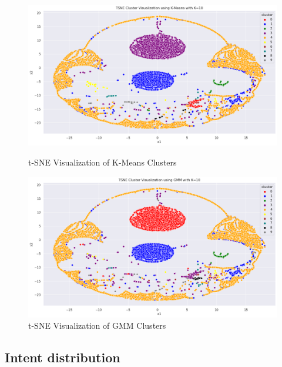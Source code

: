         \begin{figure}[h]
            \centering
            \begin{minipage}[c]{0.47\textwidth}
                \centering
                \includegraphics[width=\textwidth]{../figures/plots/section3/tsne_kmeans_clusters_1.png}
                \caption{t-SNE Visualization of K-Means Clusters}
                \label{fig:tsne_kmeans}
            \end{minipage}
            \hfill
            \begin{minipage}[c]{0.47\textwidth}
                \centering
                \includegraphics[width=\textwidth]{../figures/plots/section3/tsne_gmm_clusters_1.png}
                \caption{t-SNE Visualization of GMM Clusters}
                \label{fig:tsne_gmm}
            \end{minipage}
        \end{figure}
        
    \subsection{Intent distribution} %
    
